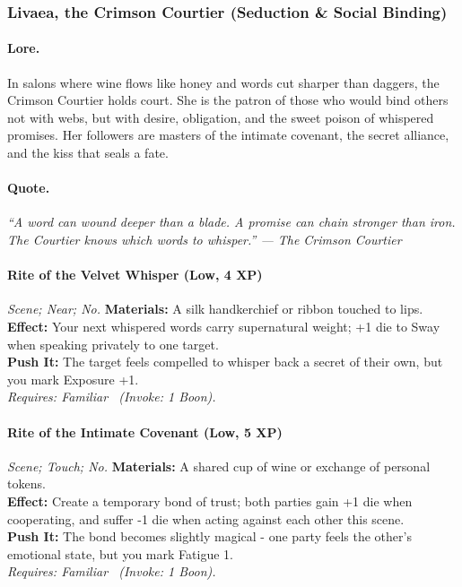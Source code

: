 \subsubsection{Livaea, the Crimson Courtier (Seduction \& Social Binding)}

\paragraph{Lore.}
In salons where wine flows like honey and words cut sharper than daggers, the Crimson Courtier holds court. She is the patron of those who would bind others not with webs, but with desire, obligation, and the sweet poison of whispered promises. Her followers are masters of the intimate covenant, the secret alliance, and the kiss that seals a fate.

\paragraph{Quote.}
\emph{“A word can wound deeper than a blade. A promise can chain stronger than iron. The Courtier knows which words to whisper.” — The Crimson Courtier}

\paragraph{Rite of the Velvet Whisper (Low, 4 XP)} \emph{Scene; Near; No.}
\textbf{Materials:} A silk handkerchief or ribbon touched to lips. \\
\textbf{Effect:} Your next whispered words carry supernatural weight; +1 die to Sway when speaking privately to one target. \\
\textbf{Push It:} The target feels compelled to whisper back a secret of their own, but you mark Exposure +1. \\
\emph{Requires: Familiar \ (\textit{Invoke:} 1 Boon).}

\paragraph{Rite of the Intimate Covenant (Low, 5 XP)} \emph{Scene; Touch; No.}
\textbf{Materials:} A shared cup of wine or exchange of personal tokens. \\
\textbf{Effect:} Create a temporary bond of trust; both parties gain +1 die when cooperating, and suffer -1 die when acting against each other this scene. \\
\textbf{Push It:} The bond becomes slightly magical - one party feels the other's emotional state, but you mark Fatigue 1. \\
\emph{Requires: Familiar \ (\textit{Invoke:} 1 Boon).}

